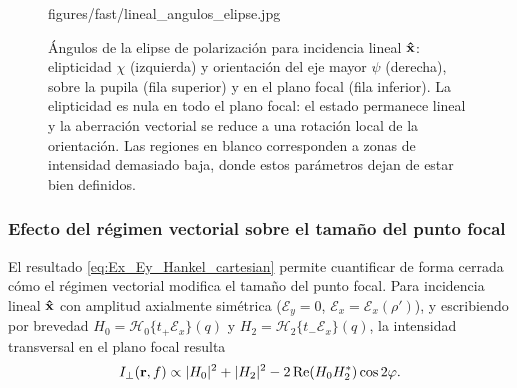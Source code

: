 \begin{figure}[!htbp]
  \centering
    {figures/fast/lineal_angulos_elipse.jpg}
  \caption{Ángulos de la elipse de polarización para incidencia lineal $\bm{\hat{\mathbf{x}}}$: elipticidad $\chi$ (izquierda) y orientación del eje mayor $\psi$ (derecha), sobre la pupila (fila superior) y en el plano focal (fila inferior). La elipticidad es nula en todo el plano focal: el estado permanece lineal y la aberración vectorial se reduce a una rotación local de la orientación. Las regiones en blanco corresponden a zonas de intensidad demasiado baja, donde estos parámetros dejan de estar bien definidos.}
  \label{fig:lineal-plano-focal-mapas-escalares}
\end{figure}

\subsubsection{Efecto del régimen vectorial sobre el tamaño del punto focal}
\label{subsubsec:spot_vectorial}

El resultado \eqref{eq:Ex_Ey_Hankel_cartesian} permite cuantificar de forma
cerrada cómo el régimen vectorial modifica el tamaño del punto focal. Para
incidencia lineal $\bm{\hat{\mathbf{x}}}$ con amplitud axialmente simétrica
($\mathscr E_y=0$, $\mathscr E_x=\mathscr E_x(\rho')$), y escribiendo por
brevedad $H_0=\mathscr H_0\{t_+\mathscr E_x\}(q)$ y
$H_2=\mathscr H_2\{t_-\mathscr E_x\}(q)$, la intensidad transversal en el
plano focal resulta
\begin{equation}
  I_\perp(\vb r, f)
  \propto
  |H_0|^2
  +
  |H_2|^2
  -
  2\operatorname{Re}(H_0 H_2^*)\cos 2\varphi.
\label{eq:I_spot_linear_deformation}
\end{equation}

